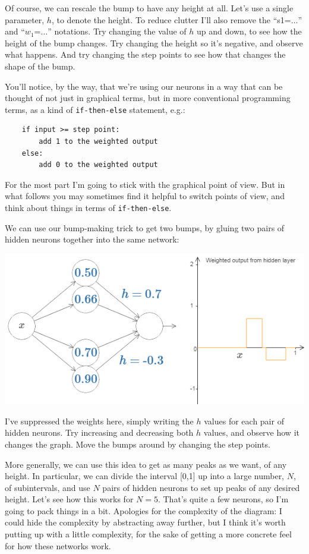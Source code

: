 Of course, we can rescale the bump to have any height at all. Let's use a single parameter, $h$, to denote the height. To reduce clutter I'll also remove the ``s1=$\ldots$'' and ``$w_1$=$\ldots$'' notations.
Try changing the value of $h$ up and down, to see how the height of the bump changes. Try changing the height so it's negative, and observe what happens. And try changing the step points to see how that changes the shape of the bump.

You'll notice, by the way, that we're using our neurons in a way that can be thought of not just in graphical terms, but in more conventional programming terms, as a kind of \lstinline{if-then-else} statement, e.g.:
\begin{lstlisting}
    if input >= step point:
        add 1 to the weighted output
    else:
        add 0 to the weighted output
\end{lstlisting}


For the most part I'm going to stick with the graphical point of view. But in what follows you may sometimes find it helpful to switch points of view, and think about things in terms of \lstinline{if-then-else}.


We can use our bump-making trick to get two bumps, by gluing two pairs of hidden neurons together into the same network:

{\centering \includegraphics[width=\textwidth,]{pic/wigglyfn15.png} \par}

I've suppressed the weights here, simply writing the $h$ values for each pair of hidden neurons. Try increasing and decreasing both $h$ values, and observe how it changes the graph. Move the bumps around by changing the step points.

More generally, we can use this idea to get as many peaks as we want, of any height. In particular, we can divide the interval [0,1]
up into a large number, $N$, of subintervals, and use $N$ pairs of hidden neurons to set up peaks of any desired height. Let's see how this works for $N=5$. That's quite a few neurons, so I'm going to pack things in a bit. Apologies for the complexity of the diagram: I could hide the complexity by abstracting away further, but I think it's worth putting up with a little complexity, for the sake of getting a more concrete feel for how these networks work.


